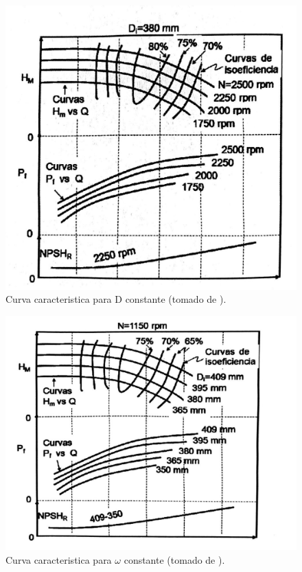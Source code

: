\documentclass[11pt, oneside]{article}
\begin{document}
\begin{figure}[h]
\centering
\includegraphics[width=12cm]{./figs/bom7.jpeg}
\caption{Curva caracteristica para D constante (tomado de \cite{cengel2013ebook}).} 
\label{bom7}
\end{figure}


\begin{figure}[h]
\centering
\includegraphics[width=12cm]{./figs/bom6.jpeg}
\caption{Curva caracteristica para $\omega$ constante (tomado de \cite{cengel2013ebook}).} 
\label{bom6}
\end{figure}
\end{document}

